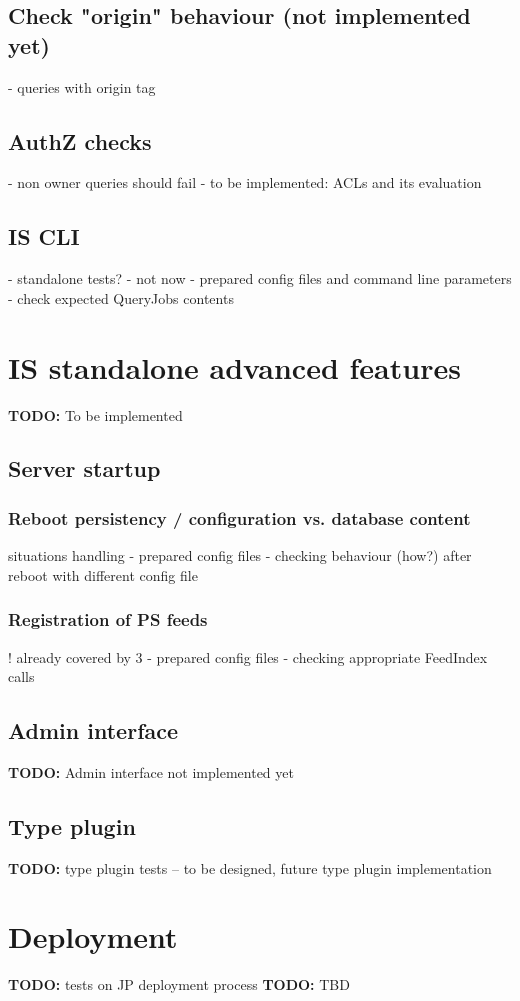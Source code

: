 \documentclass{egee}
\def\todo#1{\textbf{TODO:} #1}
\begin{document}
\subsection{Check "origin" behaviour (not implemented yet)}
- queries with origin tag

\subsection{AuthZ checks}
- non owner queries should fail
- to be implemented: ACLs and its evaluation

\subsection{IS CLI}
- standalone tests?     - not now
  - prepared config files and command line parameters
  - check expected QueryJobs contents

\section{IS standalone advanced features}
\todo{To be implemented}

\subsection{Server startup}

\subsubsection{Reboot persistency / configuration vs. database content}
    situations handling
- prepared config files
- checking behaviour (how?) after reboot with different config file

\subsubsection{Registration of PS feeds}
! already covered by 3
- prepared config files
- checking appropriate FeedIndex calls

\subsection{Admin interface}
\todo{Admin interface not implemented yet}

\subsection{Type plugin}
\todo{type plugin tests -- to be designed, future type plugin implementation}

\section{Deployment}
\todo{tests on JP deployment process}
\todo{TBD}
\end{document}
